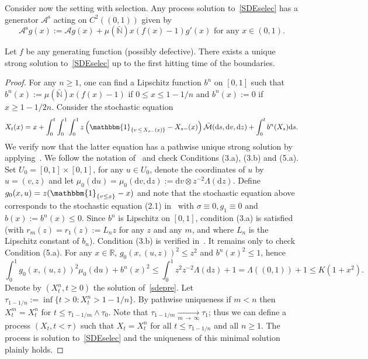 \documentclass[AHL,Unicode,longabstracts,published]{cedram}
\newcommand{\ddr}{\mathrm{d}}
\newcommand{\rms}{\mathrm{s}}
\newcommand{\bbmun}{\mathbbm{1}}
\newcommand{\bbN}{\mathbb{N}}
\newcommand{\bbR}{\mathbb{R}}
\newcommand{\clM}{\mathcal{M}}
\newcommand{\clA}{\mathcal{A}}
\begin{document}
Consider now the setting with selection. Any process solution to~\eqref{SDEselec} has a generator $\clA^{\rms}$ acting on $C^{2}((0,1))$ given by
\begin{equation}\label{generatorWFs}
\clA^{\rms}g(x):=\clA g(x)+\mu(\bar{\bbN})x(f(x)-1)g'(x) \text{ for any }x\in (0,1).
\end{equation}

\begin{lemm}\label{minimalprocess}
Let $f$ be any generating function (possibly defective). There exists a unique strong solution to~\eqref{SDEselec} up to the first hitting time of the boundaries.
\end{lemm}
\begin{proof}
For any $n\geq 1$, one can find a Lipschitz function $b^{n}$ on $[0,1]$ such that $b^{n}(x):=\mu(\bar{\bbN})x(f(x)-1)$ if $0\leq x\leq 1-1/n$ and $b^{n}(x):=0$ if $x\geq 1-1/2n$. Consider the stochastic equation
\begin{equation}\label{sdepre}
X_t(x)=x+\int_{0}^{t}\int_{0}^{1}\int_{0}^{1}z\left(\bbmun_{\left\{v\,\leq\,X_{s-}(x)\right\}}-X_{s-}(x)\right)\bar{\clM}(\ddr s,\ddr v, \ddr z)+\int_0^{t}b^{n}(X_s)\ddr s.
\end{equation}
We verify now that the latter equation has a pathwise unique strong solution by applying~\cite[Theorem~5.1]{li2012}. We follow the notation of~\cite{li2012} and check Conditions (3.a), (3.b) and (5.a). Set $U_0=[0,1]\times [0,1]$, for any $u\in U_0$, denote the coordinates of $u$ by $u=(v,z)$ and let $\mu_0(\ddr u)=\mu_0(\ddr v,\ddr z):=\ddr v \otimes z^{-2}\Lambda(\ddr z)$. Define $g_0(x,u)=z(\bbmun_{\{v\leq x\}}-x)$ and note that the stochastic equation above corresponds to the stochastic equation (2.1) in~\cite{li2012} with $\sigma\equiv 0, g_1\equiv 0$ and $b(x):=b^{n}(x)\leq 0$. Since $b^{n}$ is Lipschitz on $[0,1]$, condition (3.a) is satisfied (with $r_m(z)=r_1(z):=L_n z$ for any $z$ and any $m$, and where $L_n$ is the Lipschitz constant of $b_n$). Condition (3.b) is verified in~\cite[Corollary~6.2]{li2012}. It remains only to check Condition (5.a). For any $x\in \bbR$, $g_0(x,(u,z))^2\leq z^2$ and $b^{n}(x)^2\leq 1$, hence
\[
\int_0^1 g_0(x,(u,z))^2 \mu_0(\ddr u)+b^{n}(x)^2\leq \int_0^1 z^{2}z^{-2}\Lambda(\ddr z)+1= \Lambda((0,1))+1\leq K\left(1+x^2\right).
\]
Denote by $(X_t^{n},t\geq 0)$ the solution of~\eqref{sdepre}. Let $\tau_{1-1/n}:=\inf\{t>0: X_t^{n}> 1-1/n\}$. By pathwise uniqueness if $m<n$ then $X_t^{m}=X_t^{n}$ for $t\leq \tau_{1-1/m}\wedge \tau_0$. Note that $\tau_{1-1/m}\underset{m\,\rightarrow\,\infty}{\longrightarrow} \tau_1$; thus we can define a process $(X_t,t<\tau)$ such that $X_t=X_t^{n}$ for all $t\leq \tau_{1-1/n}$ and all $n\geq 1$. The process is solution to~\eqref{SDEselec} and the uniqueness of this minimal solution plainly holds.
\end{proof}
\end{document}
